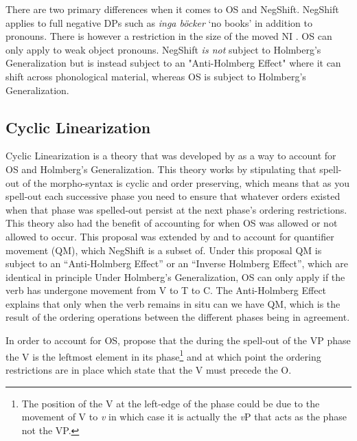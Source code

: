 \documentclass[12pt, letterpaper]{article}
\begin{document}
\ea There are two primary differences when it comes to OS and NegShift.
	\ea NegShift applies to full negative DPs such as \textit{inga böcker} `no books' in addition to pronouns. There is however a restriction in the size of the moved NI \citep{christensenInterfacesNegationSyntax2005,penkaNegativeIndefinites2011}. OS can only apply to weak object pronouns.
	\ex NegShift \emph{is not} subject to Holmberg's Generalization but is instead subject to an "Anti-Holmberg Effect" where it can shift across phonological material, whereas OS is subject to Holmberg's Generalization. 
	\z 
\z

\subsection{Cyclic Linearization} \label{sec:CL}

\ea Cyclic Linearization is a theory that was developed by \cite{foxCyclicLinearizationSyntactic2005} as a way to account for OS and Holmberg's Generalization.
\ex This theory works by stipulating that spell-out of the morpho-syntax is cyclic and order preserving, which means that as you spell-out each successive phase you need to ensure that whatever orders existed when that phase was spelled-out persist at the next phase's ordering restrictions. This theory also had the benefit of accounting for when OS was allowed or not allowed to occur. 
\ex This proposal was extended by \citet{foxCyclicLinearizationSyntactic2005} and \citet{engelsMicrovariationObjectPositions2011,engelsScandinavianNegativeIndefinites2012} to account for quantifier movement (QM), which NegShift is a subset of. 
\ex Under this proposal QM is subject to an ``Anti-Holmberg Effect'' or an ``Inverse Holmberg Effect'', which are identical in principle
	\ea Under Holmberg's Generalization, OS can only apply if the verb has undergone movement from V to T to C.
	\ex The Anti-Holmberg Effect explains that only when the verb remains in situ can we have QM, which is the result of the ordering operations between the different phases being in agreement. 
	\z
	\vspace{6pt} 

\ex In order to account for OS, \citeauthor{foxCyclicLinearizationSyntactic2005} propose that the during the spell-out of the VP phase the V is the leftmost element in its phase\footnote{The position of the V at the left-edge of the phase could be due to the movement of V to \textit{v} in which case it is actually the \textit{v}P that acts as the phase not the VP.} and at which point the ordering restrictions are in place which state that the V must precede the O. 
\end{document}
